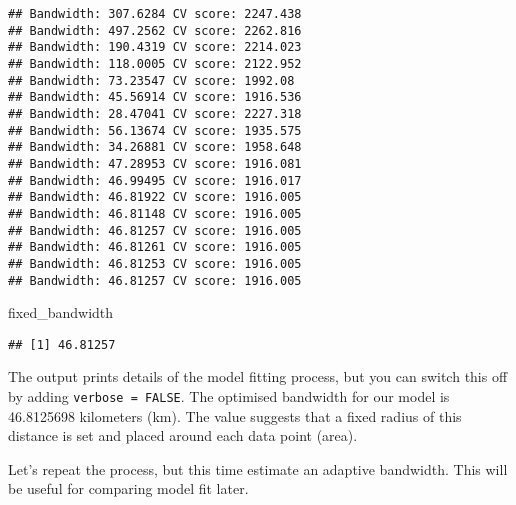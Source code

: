 \documentclass[
]{book}
\newenvironment{Shaded}{\begin{snugshade}}{\end{snugshade}}
\newcommand{\AttributeTok}[1]{\textcolor[rgb]{0.77,0.63,0.00}{#1}}
\newcommand{\CommentTok}[1]{\textcolor[rgb]{0.56,0.35,0.01}{\textit{#1}}}
\newcommand{\ConstantTok}[1]{\textcolor[rgb]{0.00,0.00,0.00}{#1}}
\newcommand{\FunctionTok}[1]{\textcolor[rgb]{0.00,0.00,0.00}{#1}}
\newcommand{\NormalTok}[1]{#1}
\newcommand{\OtherTok}[1]{\textcolor[rgb]{0.56,0.35,0.01}{#1}}
\newcommand{\SpecialCharTok}[1]{\textcolor[rgb]{0.00,0.00,0.00}{#1}}
\newcommand{\StringTok}[1]{\textcolor[rgb]{0.31,0.60,0.02}{#1}}
\begin{document}
\begin{verbatim}
## Bandwidth: 307.6284 CV score: 2247.438 
## Bandwidth: 497.2562 CV score: 2262.816 
## Bandwidth: 190.4319 CV score: 2214.023 
## Bandwidth: 118.0005 CV score: 2122.952 
## Bandwidth: 73.23547 CV score: 1992.08 
## Bandwidth: 45.56914 CV score: 1916.536 
## Bandwidth: 28.47041 CV score: 2227.318 
## Bandwidth: 56.13674 CV score: 1935.575 
## Bandwidth: 34.26881 CV score: 1958.648 
## Bandwidth: 47.28953 CV score: 1916.081 
## Bandwidth: 46.99495 CV score: 1916.017 
## Bandwidth: 46.81922 CV score: 1916.005 
## Bandwidth: 46.81148 CV score: 1916.005 
## Bandwidth: 46.81257 CV score: 1916.005 
## Bandwidth: 46.81261 CV score: 1916.005 
## Bandwidth: 46.81253 CV score: 1916.005 
## Bandwidth: 46.81257 CV score: 1916.005
\end{verbatim}

\begin{Shaded}
\begin{Highlighting}[]
\NormalTok{fixed\_bandwidth}
\end{Highlighting}
\end{Shaded}

\begin{verbatim}
## [1] 46.81257
\end{verbatim}

The output prints details of the model fitting process, but you can switch this off by adding \texttt{verbose\ =\ FALSE}. The optimised bandwidth for our model is 46.8125698 kilometers (km). The value suggests that a fixed radius of this distance is set and placed around each data point (area).

Let's repeat the process, but this time estimate an adaptive bandwidth. This will be useful for comparing model fit later.

\begin{Shaded}
\end{Shaded}
\end{document}
